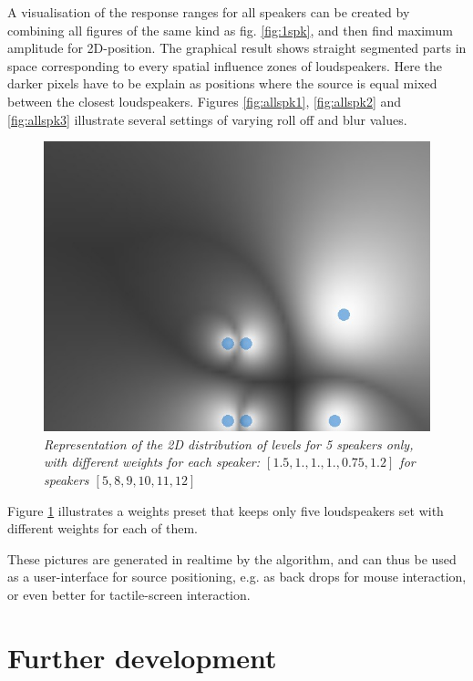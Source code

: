 \documentclass[twoside,10pt]{article}
\begin{document}
A visualisation of the response ranges for all speakers can be created by combining all figures of the same kind as fig. \ref{fig:1spk}, and then find maximum amplitude for 2D-position. The graphical result shows straight segmented parts in space corresponding to every spatial influence zones of loudspeakers. Here the darker pixels have to be explain as positions where the source is equal mixed between the closest loudspeakers. Figures \ref{fig:allspk1}, \ref{fig:allspk2} and \ref{fig:allspk3} illustrate several settings of varying roll off and blur values. 

\begin{figure}[ht]
\centerline{\includegraphics[scale=0.5]{spk_groups}}
\caption{{\it Representation of the 2D distribution of levels for 5 speakers only, with different weights for each speaker: $[1.5,1.,1.,1.,0.75,1.2]$ for speakers $[5,8,9,10,11,12]$}}  
\label{fig:5spk_weights}
\end{figure}

Figure \ref{fig:5spk_weights} illustrates a weights preset that keeps only five loudspeakers set with different weights for each of them.

These pictures are generated in realtime by the algorithm, and can thus be used as a user-interface for source positioning, e.g. as back drops for mouse interaction, or even better for tactile-screen interaction.



\section{Further development}
\end{document}
